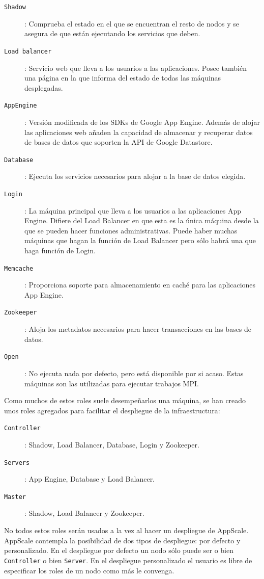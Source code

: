 \begin{description}
\item[\texttt{Shadow}]: Comprueba el estado en el que se encuentran el resto de nodos y se asegura de que están ejecutando los servicios que deben.
\item[\texttt{Load balancer}]: Servicio web que lleva a los usuarios a las aplicaciones. Posee también una página en la que informa del estado de todas las máquinas desplegadas.
\item[\texttt{AppEngine}]: Versión modificada de los SDKs de Google App Engine. Además de alojar las aplicaciones web añaden la capacidad de almacenar y recuperar datos de bases de datos que soporten la API de Google Datastore.
\item[\texttt{Database}]: Ejecuta los servicios necesarios para alojar a la base de datos elegida.
\item[\texttt{Login}]: La máquina principal que lleva a los usuarios a las aplicaciones App Engine. Difiere del Load Balancer en que esta es la única máquina desde la que se pueden hacer funciones administrativas. Puede haber muchas máquinas que hagan la función de Load Balancer pero sólo habrá una que haga función de Login.
\item[\texttt{Memcache}]: Proporciona soporte para almacenamiento en caché para las aplicaciones App Engine.
\item[\texttt{Zookeeper}]: Aloja los metadatos necesarios para hacer transacciones en las bases de datos.
\item[\texttt{Open}]: No ejecuta nada por defecto, pero está disponible por si acaso. Estas máquinas son las utilizadas para ejecutar trabajos MPI.
\end{description}

Como muchos de estos roles suele desempeñarlos una máquina, se han creado unos roles agregados para facilitar el despliegue de la infraestructura:

\begin{description}
\item[\texttt{Controller}]: Shadow, Load Balancer, Database, Login y Zookeeper.
\item[\texttt{Servers}]: App Engine, Database y Load Balancer.
\item[\texttt{Master}]: Shadow, Load Balancer y Zookeeper.
\end{description}

No todos estos roles serán usados a la vez al hacer un despliegue de AppScale. AppScale contempla la posibilidad de dos tipos de despliegue: por defecto y personalizado. En el despliegue por defecto un nodo sólo puede ser o bien \texttt{Controller} o bien \texttt{Server}. En el despliegue personalizado el usuario es libre de especificar los roles de un nodo como más le convenga. \\

